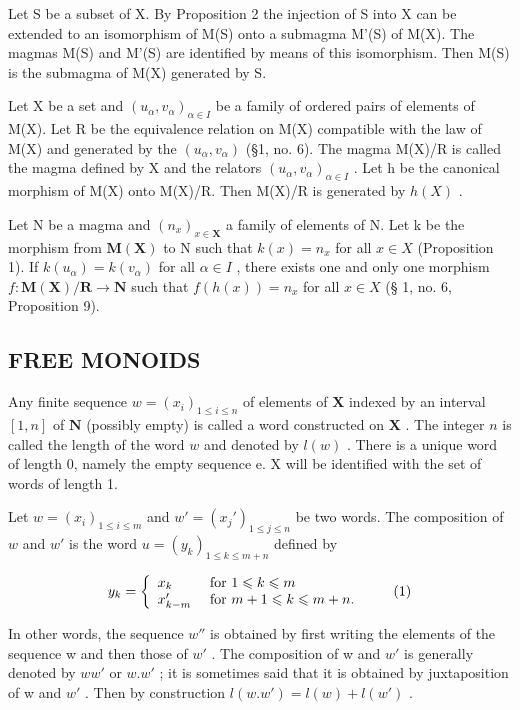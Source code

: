 Let S be a subset of X. By Proposition 2 the injection of S into X can be extended to an isomorphism of M(S) onto a submagma M'(S) of M(X). The magmas M(S) and M'(S) are identified by means of this isomorphism. Then M(S) is the submagma of M(X) generated by S.

Let X be a set and \((u_{\alpha}, v_{\alpha})_{\alpha \in I}\) be a family of ordered pairs of elements of M(X). Let R be the equivalence relation on M(X) compatible with the law of M(X) and generated by the \((u_{\alpha}, v_{\alpha})\) (§1, no. 6). The magma M(X)/R is called the magma defined by X and the relators \((u_{\alpha}, v_{\alpha})_{\alpha \in I}\) . Let h be the canonical morphism of M(X) onto M(X)/R. Then M(X)/R is generated by \(h(X)\) .

Let N be a magma and \((n_{x})_{x\in\mathbf{X}}\) a family of elements of N. Let k be the morphism from \(\mathbf{M}(\mathbf{X})\) to N such that \(k(x)=n_{x}\) for all \(x\in X\) (Proposition 1). If \(k(u_{\alpha})=k(v_{\alpha})\) for all \(\alpha\in I\) , there exists one and only one morphism \(f\colon\mathbf{M}(\mathbf{X})/\mathbf{R}\to\mathbf{N}\) such that \(f(h(x))=n_{x}\) for all \(x\in X\) (§ 1, no. 6, Proposition 9).

\subsection{FREE MONOIDS}

Any finite sequence \(w = (x_{i})_{1 \leqslant i \leqslant n}\) of elements of \(\mathbf{X}\) indexed by an interval \([1, n]\) of \(\mathbf{N}\) (possibly empty) is called a word constructed on \(\mathbf{X}\) . The integer \(n\) is called the length of the word \(w\) and denoted by \(l(w)\) . There is a unique word of length 0, namely the empty sequence e. X will be identified with the set of words of length 1.

Let \(w = (x_{i})_{1 \leqslant i \leqslant m}\) and \(w' = (x_{j}')_{1 \leqslant j \leqslant n}\) be two words. The composition of \(w\) and \(w'\) is the word \(u = (y_{k})_{1 \leqslant k \leqslant m + n}\) defined by

\[
y _ {k} = \left\{ \begin{array}{l l} x _ {k} & \text { for } 1 \leqslant k \leqslant m \\ x _ {k - m} ^ {\prime} & \text { for } m + 1 \leqslant k \leqslant m + n. \end{array} \right.\tag{1}
\]

In other words, the sequence \(w''\) is obtained by first writing the elements of the sequence w and then those of \(w'\) . The composition of w and \(w'\) is generally denoted by \(ww'\) or \(w.w'\) ; it is sometimes said that it is obtained by juxtaposition of w and \(w'\) . Then by construction \(l(w.w') = l(w) + l(w')\) .

